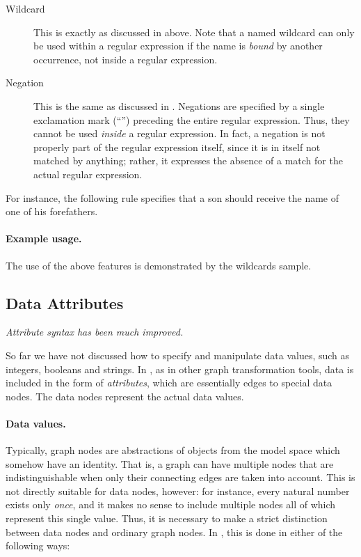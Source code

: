 \begin{description}
\item[Wildcard] This is exactly as discussed in  above.  Note
  that a named wildcard can only be used within a regular expression if the
  name is \emph{bound} by another occurrence, not inside a regular expression.

\item[Negation] This is the same as discussed in . Negations
  are specified by a single exclamation mark (``\lab{!}'') preceding the
  entire regular expression. Thus, they cannot be used \emph{inside} a
  regular expression. In fact, a negation is not properly part of the regular
  expression itself, since it is in itself not matched by anything; rather, it
  expresses the absence of a match for the actual regular expression.
\end{description}

For instance, the following rule specifies that a son should receive the name
of one of his forefathers.


\paragraph{Example usage.}

The use of the above features is demonstrated by the \GROOVE \textsf{wildcards}
sample.

\subsection{Data Attributes}

\emph{Attribute syntax has been much improved.}

\medskip\noindent
So far we have not discussed how to specify and manipulate data values, such as
integers, booleans and strings. In \GROOVE, as in other graph transformation
tools, data is included in the form of \emph{attributes}, which are essentially
edges to special data nodes. The data nodes represent the actual data values.

\paragraph{Data values.}

Typically, graph nodes are abstractions of objects from the model space which
somehow have an identity. That is, a graph can have multiple nodes that are
indistinguishable when only their connecting edges are taken into account. This
is not directly suitable for data nodes, however: for instance, every natural
number exists only \emph{once}, and it makes no sense to include multiple nodes
all of which represent this single value. Thus, it is necessary to make a
strict distinction between data nodes and ordinary graph nodes. In \GROOVE,
this is done in either of the following ways:

